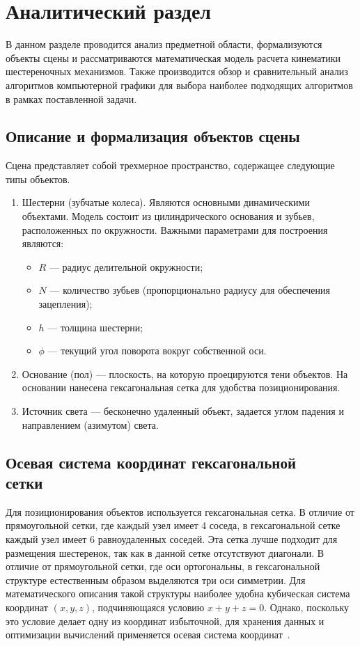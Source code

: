 \section{Аналитический раздел}

В данном разделе проводится анализ предметной области, формализуются объекты сцены и рассматриваются математическая модель расчета кинематики шестереночных механизмов. Также производится обзор и сравнительный анализ алгоритмов компьютерной графики для выбора наиболее подходящих алгоритмов в рамках поставленной задачи.

\subsection{Описание и формализация объектов сцены}

Сцена представляет собой трехмерное пространство, содержащее следующие типы объектов.
\begin{enumerate}
	\item Шестерни (зубчатые колеса). Являются основными динамическими объектами. Модель состоит из цилиндрического основания и зубьев, расположенных по окружности. Важными параметрами для построения являются:
	      \begin{itemize}
		      \item $R$ --- радиус делительной окружности;
		      \item $N$ --- количество зубьев (пропорционально радиусу для обеспечения зацепления);
		      \item $h$ --- толщина шестерни;
		      \item $\phi$ --- текущий угол поворота вокруг собственной оси.
	      \end{itemize}
	\item Основание (пол) --- плоскость, на которую проецируются тени объектов. На основании нанесена гексагональная сетка для удобства позиционирования.
	\item Источник света --- бесконечно удаленный объект, задается углом падения и направлением (азимутом) света.
\end{enumerate}

\subsection[Осевая система координат гексагональной сетки]{Осевая система координат гексагональной \\ сетки}
Для позиционирования объектов используется гексагональная сетка. В отличие от прямоугольной сетки, где каждый узел имеет 4 соседа, в гексагональной сетке каждый узел имеет 6 равноудаленных соседей. Эта сетка лучше подходит для размещения шестеренок, так как в данной сетке отсутствуют диагонали.
В отличие от прямоугольной сетки, где оси ортогональны, в гексагональной структуре естественным образом выделяются три оси симметрии. Для математического описания такой структуры наиболее удобна кубическая система координат $(x, y, z)$, подчиняющаяся условию $x + y + z = 0$. Однако, поскольку это условие делает одну из координат избыточной, для хранения данных и оптимизации вычислений применяется осевая система координат~\cite{redblob_hex}.

